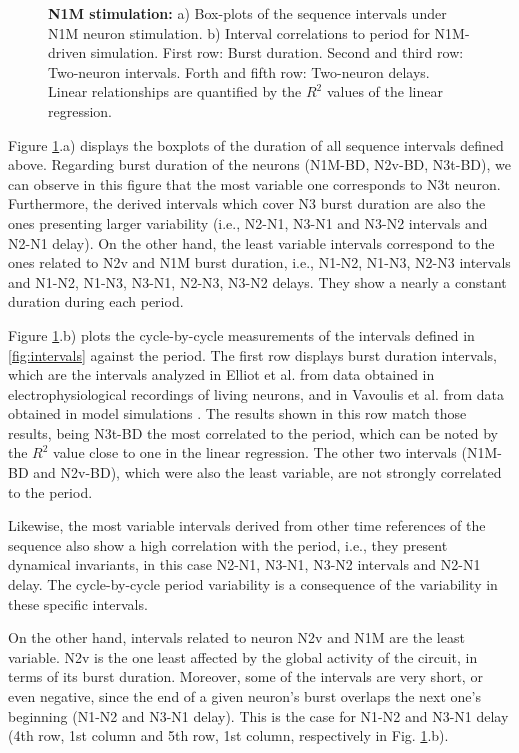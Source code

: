 \begin{figure}[hbt!]
\begin{minipage}[b]{0.53\textwidth}
\begin{minipage}[b]{\textwidth}
		\end{minipage}
	\end{minipage}
	\caption{\textbf{N1M stimulation:} a) Box-plots of the  sequence intervals under N1M neuron stimulation. b) Interval correlations to period for N1M-driven simulation. First row: Burst duration. Second and third row: Two-neuron intervals. Forth and fifth row: Two-neuron delays. Linear relationships are quantified by the $R^2$ values of the linear regression.}
	\label{fig:invariant n1m}
\end{figure}

Figure \ref{fig:invariant n1m}.a) displays the boxplots of the duration of all sequence intervals defined above. Regarding burst duration of the neurons (N1M-BD, N2v-BD, N3t-BD), we can observe in this figure that the most variable one corresponds to N3t neuron. Furthermore, the derived intervals which cover N3 burst duration are also the ones presenting larger variability (i.e., N2-N1, N3-N1 and N3-N2 intervals and N2-N1 delay). On the other hand, the least variable intervals correspond to the ones related to N2v and N1M burst duration, i.e., N1-N2, N1-N3, N2-N3 intervals and N1-N2, N1-N3, N3-N1, N2-N3, N3-N2 delays. They show a nearly a constant duration during each period.

Figure \ref{fig:invariant n1m}.b) plots the cycle-by-cycle measurements of the intervals defined in \ref{fig:intervals} against the period. The first row displays burst duration intervals, which are the intervals analyzed in Elliot et al. \parencite{Elliott1991} from data obtained in electrophysiological recordings of living neurons, and in Vavoulis et al. from data obtained in model simulations \parencite{vavoulis_computational_2007}. The results shown in this row match those results, being N3t-BD the most correlated to the period, which can be noted by the $R^2$ value close to one in the linear regression. The other two intervals (N1M-BD and N2v-BD), which were also the least variable, are not strongly correlated to the period. 

Likewise, the most variable intervals derived from other time references of the sequence also show a high correlation with the period, i.e., they present dynamical invariants, in this case N2-N1, N3-N1, N3-N2 intervals and N2-N1 delay. The cycle-by-cycle period variability is a consequence of the variability in these specific intervals.

On the other hand, intervals related to neuron N2v and N1M are the least variable. N2v is the one least affected by the global activity of the circuit, in terms of its burst duration. Moreover, some of the intervals are very short, or even negative, since the end of a given neuron's burst overlaps the next one's beginning (N1-N2 and N3-N1 delay). This is the case for N1-N2 and N3-N1 delay (4th row, 1st column and 5th row, 1st column, respectively in Fig. \ref{fig:invariant n1m}.b).  




